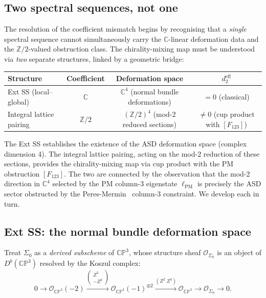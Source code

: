 \documentclass[11pt,a4paper]{article}
\theoremstyle{remark}
\newcommand{\CP}{\mathbb{CP}}
\newcommand{\C}{\mathbb{C}}
\newcommand{\Z}{\mathbb{Z}}
\begin{document}
\subsection{Two spectral sequences, not one}
\label{sec:two-ss}

The resolution of the coefficient mismatch begins by recognising that a
\emph{single} spectral sequence cannot simultaneously carry the $\C$-linear
deformation data and the $\Z/2$-valued obstruction class. The chirality-mixing
map must be understood via \emph{two} separate structures, linked by a
geometric bridge:

\begin{center}
\begin{tabular}{l|c|c|c}
  \textbf{Structure} & \textbf{Coefficient} & \textbf{Deformation space}
    & $d_2^{\text{eff}}$ \\ \hline
  Ext SS (local--global) & $\C$ & $\C^4$ (normal bundle
    deformations) & $=0$ (classical) \\
  Integral lattice pairing & $\Z/2$ & $(\Z/2)^4$ (mod-2 reduced
    sections) & $\neq 0$ (cup product with $[F_{123}]$)
\end{tabular}
\end{center}

The Ext SS establishes the existence of the ASD deformation space (complex
dimension 4). The integral lattice pairing, acting on the mod-2 reduction of
these sections, provides the chirality-mixing map via cup product with the
PM obstruction $[F_{123}]$. The two are connected by the observation that the
mod-2 direction in $\C^4$ selected by the PM column-3 eigenstate
$\ell_{\text{PM}}$ is precisely the ASD sector obstructed by the
Peres-Mermin~\cite{PeresMermin} column-3 constraint. We develop each in turn.

\subsection{Ext SS: the normal bundle deformation space}
\label{sec:ext-ss}

Treat $\Sigma_0$ as a \emph{derived subscheme} of $\CP^3$, whose structure
sheaf $\mathcal{O}_{\Sigma_0}$ is an object of $D^b(\CP^3)$ resolved by
the Koszul complex:
\begin{equation}
  0 \to \mathcal{O}_{\CP^3}(-2)
  \xrightarrow{\begin{pmatrix}Z^3 \\ -Z^2\end{pmatrix}}
  \mathcal{O}_{\CP^3}(-1)^{\oplus 2}
  \xrightarrow{(Z^2 \; Z^3)}
  \mathcal{O}_{\CP^3}
  \to \mathcal{O}_{\Sigma_0} \to 0.
\end{equation}
\end{document}
